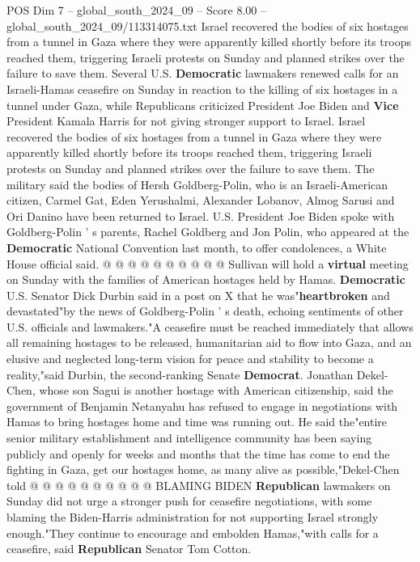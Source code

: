 \begin{textsample}{POS Dim 7 – global\_south\_2024\_09 – Score 8.00 – global\_south\_2024\_09/113314075.txt}  \label{ex:f7_pos_229}
Israel recovered the bodies of six hostages from a tunnel in Gaza where they were apparently killed shortly before its troops reached them, triggering Israeli protests on Sunday and planned strikes over the failure to save them.
Several U.S. \textbf{Democratic} lawmakers renewed calls for an Israeli-Hamas ceasefire on Sunday in reaction to the killing of six hostages in a tunnel under Gaza, while Republicans criticized President Joe Biden and \textbf{Vice} President Kamala Harris for not giving stronger support to Israel.
Israel recovered the bodies of six hostages from a tunnel in Gaza where they were apparently killed shortly before its troops reached them, triggering Israeli protests on Sunday and planned strikes over the failure to save them.
The military said the bodies of Hersh Goldberg-Polin, who is an Israeli-American citizen, Carmel Gat, Eden Yerushalmi, Alexander Lobanov, Almog Sarusi and Ori Danino have been returned to Israel.
U.S.
President Joe Biden spoke with Goldberg-Polin ' s parents, Rachel Goldberg and Jon Polin, who appeared at the \textbf{Democratic} National Convention last month, to offer condolences, a White House official said. @ @ @ @ @ @ @ @ @ @ Sullivan will hold a \textbf{virtual} meeting on Sunday with the families of American hostages held by Hamas. \textbf{Democratic} U.S.
Senator Dick Durbin said in a post on X that he was"\textbf{heartbroken} and devastated"by the news of Goldberg-Polin ' s death, echoing sentiments of other U.S. officials and lawmakers."A ceasefire must be reached immediately that allows all remaining hostages to be released, humanitarian aid to flow into Gaza, and an elusive and neglected long-term vision for peace and stability to become a reality,"said Durbin, the second-ranking Senate \textbf{Democrat}.
Jonathan Dekel-Chen, whose son Sagui is another hostage with American citizenship, said the government of Benjamin Netanyahu has refused to engage in negotiations with Hamas to bring hostages home and time was running out.
He said the"entire senior military establishment and intelligence community has been saying publicly and openly for weeks and months that the time has come to end the fighting in Gaza, get our hostages home, as many alive as possible,"Dekel-Chen told @ @ @ @ @ @ @ @ @ @ BLAMING BIDEN \textbf{Republican} lawmakers on Sunday did not urge a stronger push for ceasefire negotiations, with some blaming the Biden-Harris administration for not supporting Israel strongly enough."They continue to encourage and embolden Hamas,"with calls for a ceasefire, said \textbf{Republican} Senator Tom Cotton.

\end{textsample}
